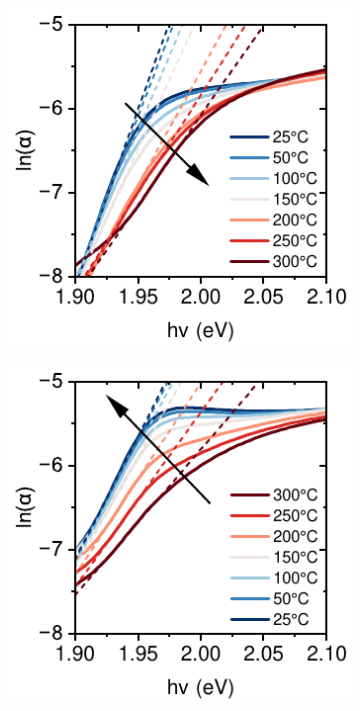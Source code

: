 \begin{figure}[htbp]
    \centering
    \begin{subfigure}{0.32\textwidth}
        \includegraphics[width=\textwidth]{chapters/ellipsometry/image/Urbach_heating.pdf}
        \caption{}
        \label{fig:ellipsometry:urbach_heating}
    \end{subfigure}
    \hfill
    \begin{subfigure}{0.32\textwidth}
        \includegraphics[width=\textwidth]{chapters/ellipsometry/image/Urbach_cooling.pdf}

\end{subfigure}
\end{figure}
